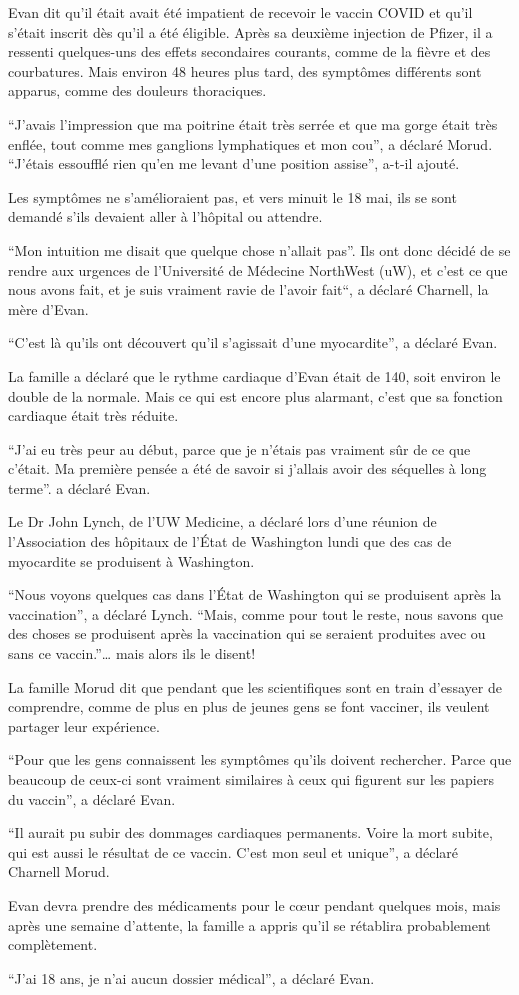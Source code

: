 Evan dit qu'il était avait été impatient de recevoir le vaccin COVID et qu'il
s'était inscrit dès qu'il a été éligible. Après sa deuxième injection de Pfizer,
il a ressenti quelques-uns des effets secondaires courants, comme de la fièvre
et des courbatures. Mais environ 48 heures plus tard, des symptômes différents
sont apparus, comme des douleurs thoraciques.

“J'avais l'impression que ma poitrine était très serrée et que ma gorge était
très enflée, tout comme mes ganglions lymphatiques et mon cou”, a déclaré
Morud. “J'étais essoufflé rien qu'en me levant d'une position assise”, a-t-il
ajouté.

Les symptômes ne s'amélioraient pas, et vers minuit le 18 mai, ils se sont demandé s'ils devaient aller à l'hôpital ou attendre.

“Mon intuition me disait que quelque chose n'allait pas”. Ils ont donc décidé de
se rendre aux urgences de l'Université de Médecine NorthWest (uW), et c'est ce
que nous avons fait, et je suis vraiment ravie de l'avoir fait“, a déclaré
Charnell, la mère d'Evan.

“C'est là qu'ils ont découvert qu'il s'agissait d'une myocardite”, a déclaré
Evan.

La famille a déclaré que le rythme cardiaque d'Evan était de 140, soit environ
le double de la normale. Mais ce qui est encore plus alarmant, c'est que sa
fonction cardiaque était très réduite.

“J'ai eu très peur au début, parce que je n'étais pas vraiment sûr de ce que
c'était. Ma première pensée a été de savoir si j'allais avoir des séquelles à
long terme”. a déclaré Evan.

Le Dr John Lynch, de l'UW Medicine, a déclaré lors d'une réunion de
l'Association des hôpitaux de l'État de Washington lundi que des cas de
myocardite se produisent à Washington.

“Nous voyons quelques cas dans l'État de Washington qui se produisent après la
vaccination”, a déclaré Lynch. “Mais, comme pour tout le reste, nous savons que
des choses se produisent après la vaccination qui se seraient produites avec ou
sans ce vaccin.”… mais alors ils le disent!

La famille Morud dit que pendant que les scientifiques sont en train d'essayer
de comprendre, comme de plus en plus de jeunes gens se font vacciner, ils
veulent partager leur expérience.

“Pour que les gens connaissent les symptômes qu'ils doivent rechercher. Parce
que beaucoup de ceux-ci sont vraiment similaires à ceux qui figurent sur les
papiers du vaccin”, a déclaré Evan.

“Il aurait pu subir des dommages cardiaques permanents. Voire la mort subite,
qui est aussi le résultat de ce vaccin. C'est mon seul et unique”, a déclaré
Charnell Morud.

Evan devra prendre des médicaments pour le cœur pendant quelques mois, mais
après une semaine d'attente, la famille a appris qu'il se rétablira probablement
complètement.

“J'ai 18 ans, je n'ai aucun dossier médical”, a déclaré Evan.


